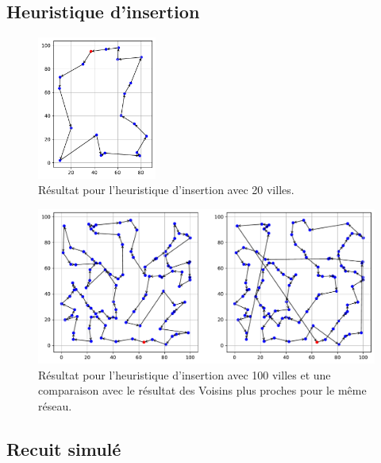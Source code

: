 \documentclass[a4paper,11pt,fleqn]{article}
\begin{document}
\subsection*{Heuristique d'insertion}

\begin{figure}[H]
    \centering
    \includegraphics[width=0.35\textwidth]{images/insertion_20_villes.pdf}
    \caption{Résultat pour l'heuristique d'insertion avec 20 villes.}
    \label{fig:insert-20}
\end{figure}

\begin{figure}[H]
    \centering
    \includegraphics[width=\textwidth]{images/insertion_100_villes_nn.pdf}
    \caption{Résultat pour l'heuristique d'insertion avec 100 villes et une comparaison avec le résultat des Voisins plus proches pour le même réseau.}
    \label{fig:insert-100}
\end{figure}

\subsection*{Recuit simulé}
\end{document}
